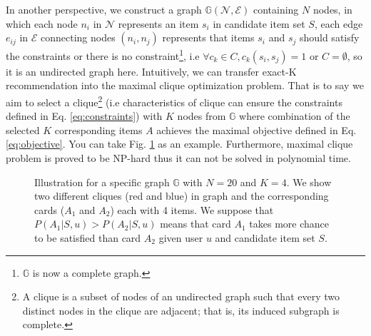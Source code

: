 In another perspective, we construct a graph $\mathbb{G}(\mathcal{N},\mathcal{E})$ containing $N$ nodes, in which each node $n_i$ in $\mathcal{N}$ represents an item $s_i$ in candidate item set $S$, each edge $e_{ij}$ in $\mathcal{E}$ connecting nodes $(n_i,n_j)$ represents that items $s_i$ and $s_j$ should satisfy the constraints or there is no constraint\footnote{$\mathbb{G}$ is now a complete graph.},
i.e $\forall c_k\in C, c_{k}(s_i,s_j)=1$ or $C=\emptyset$, so it is an undirected graph here.
Intuitively, we can transfer exact-K recommendation into the maximal clique optimization problem. 
That is to say we aim to select a clique\footnote{A clique is a subset of nodes of an undirected graph such that every two distinct nodes in the clique are adjacent; that is, its induced subgraph is complete.}
(i.e characteristics of clique can ensure the constraints defined in Eq. \ref{eq:constraints})
with $K$ nodes from $\mathbb{G}$ where combination of the selected $K$ corresponding items $A$ achieves the maximal objective defined in Eq. \ref{eq:objective}.
You can take Fig. \ref{fig:clique} as an example.
Furthermore, maximal clique problem is proved to be NP-hard \cite{pardalos1994maximum} thus it can not be solved in polynomial time.
\begin{figure}[th]
	\centering
	\caption{Illustration for a specific graph $\mathbb{G}$ with $N=20$ and $K=4$.
	We show two different cliques (red and blue) in graph and the corresponding cards ($A_1$ and $A_2$) each with 4 items.
	We suppose that $P(A_1|S,u)>P(A_2|S,u)$ means that card $A_1$ takes more chance to be satisfied than card $A_2$ given user $u$ and candidate item set $S$.}
	\label{fig:clique}
\end{figure}

